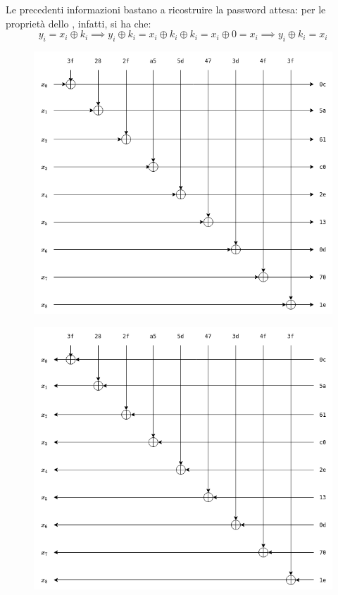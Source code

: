 \documentclass[a4paper, 12pt]{article}
\newcommand{\code}[1]{\colorbox{cverbbg}{\texttt{\StrSubstitute{#1}{_}{\_}}}}
\newcommand*\xor{\oplus}
\begin{document}
Le precedenti informazioni bastano a ricostruire la password attesa: per le proprietà dello \code{XOR}, infatti, si ha che: 
\[
y_i = x_i \xor k_i \implies y_i \xor k_i = x_i \xor k_i \xor k_i = x_i \xor 0 = x_i \implies y_i \xor k_i = x_i 
\]

\begin{minipage}{0.45\textwidth}
\begin{figure}[H]
\centering \includegraphics[width=\textwidth]{expected_xor_schema}
\end{figure}
\end{minipage}\hfill	
\begin{minipage}{0.45\textwidth}
\begin{figure}[H]
\centering \includegraphics[width=\textwidth]{xor_property}
\end{figure}
\end{minipage}\bigskip
\end{document}
